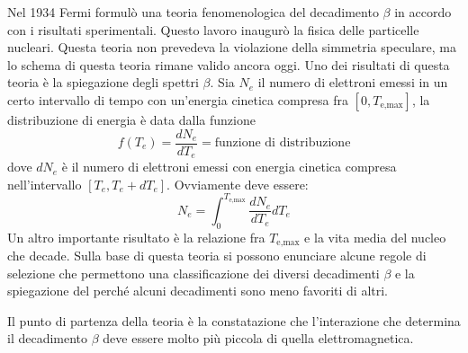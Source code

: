 Nel 1934 Fermi formulò una teoria fenomenologica del decadimento $\beta$ in accordo con i risultati sperimentali. Questo lavoro inaugurò la fisica delle particelle nucleari.
Questa teoria non prevedeva la violazione della simmetria speculare, ma lo schema di questa teoria rimane valido ancora oggi. Uno dei risultati di questa teoria è la spiegazione
degli spettri $\beta$. Sia $N_e$ il numero di elettroni emessi in un certo intervallo di tempo con un'energia cinetica compresa fra $[0,T_{\text{e,max}}]$, la distribuzione
di energia è data dalla funzione
\[
f(T_e)=\frac{dN_e}{dT_e}=\text{funzione di distribuzione}
\]
dove $dN_e$ è il numero di elettroni emessi con energia cinetica compresa nell'intervallo $[T_e,T_e+dT_e]$. Ovviamente deve essere:
\[
N_e=\int_0^{T_{\text{e,max}}}\frac{dN_e}{dT_e}dT_e
\]
Un altro importante risultato è la relazione fra $T_{\text{e,max}}$ e la vita media del nucleo che decade. Sulla base di questa teoria si possono enunciare alcune regole di selezione
che permettono una classificazione dei diversi decadimenti $\beta$ e la spiegazione del perché alcuni decadimenti sono meno favoriti di altri.

Il punto di partenza della teoria è la constatazione che l'interazione che determina il decadimento $\beta$ deve essere molto più piccola di quella elettromagnetica.

